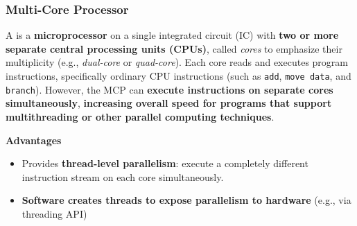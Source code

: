 \longline

\subsubsection{Multi-Core Processor}

A  is a \textbf{microprocessor} on a single integrated circuit (IC) with \textbf{two or more separate central processing units (CPUs)}, called \emph{cores} to emphasize their multiplicity (e.g., \emph{dual-core} or \emph{quad-core}). Each core reads and executes program instructions, specifically ordinary CPU instructions (such as \texttt{add}, \texttt{move data}, and \texttt{branch}). However, the MCP can \textbf{execute instructions on separate cores simultaneously}, \textbf{increasing overall speed for programs that support multithreading or other parallel computing techniques}.
\begin{flushleft}
    \textcolor{Green3}{ \textbf{Advantages}}
\end{flushleft}
\begin{itemize}
    \item Provides \textbf{thread-level parallelism}: execute a completely different instruction stream on each core simultaneously.
    \item \textbf{Software creates threads to expose parallelism to hardware} (e.g., via threading API)
\end{itemize}